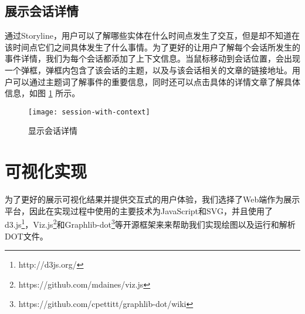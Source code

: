 \subsection{展示会话详情}
通过Storyline，用户可以了解哪些实体在什么时间点发生了交互，但是却不知道在该时间点它们之间具体发生了什么事情。为了更好的让用户了解每个会话所发生的事件详情，我们为每个会话都添加了上下文信息。当鼠标移动到会话位置，会出现一个弹框，弹框内包含了该会话的主题，以及与该会话相关的文章的链接地址。用户可以通过主题词了解事件的重要信息，同时还可以点击具体的详情文章了解具体信息，如图 \ref{fig:session-with-context} 所示。
\begin{figure}[htb]
    \centering
        \texttt{[image: session-with-context]}
    \caption{显示会话详情}
    \label{fig:session-with-context}
\end{figure}

\section{可视化实现}
为了更好的展示可视化结果并提供交互式的用户体验，我们选择了Web端作为展示平台，因此在实现过程中使用的主要技术为JavaScript和SVG，并且使用了d3.js\footnote{http://d3js.org/}，Viz.js\footnote{https://github.com/mdaines/viz.js}和Graphlib-dot\footnote{https://github.com/cpettitt/graphlib-dot/wiki}等开源框架来来帮助我们实现绘图以及运行和解析DOT文件。
